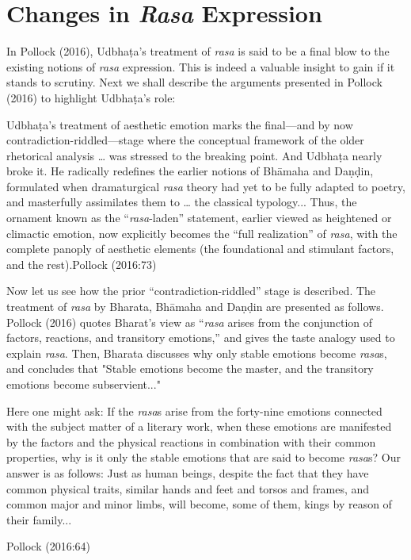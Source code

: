 \section*{Changes in \textsl{Rasa} Expression}

In Pollock (2016), Udbhaṭa’s treatment of \textsl{rasa} is said to be a final blow to the existing notions of \textsl{rasa} expression. This is indeed a valuable insight to gain if it stands to scrutiny. Next we shall describe the arguments presented in Pollock (2016) to highlight Udbhaṭa’s role: 

\begin{myquote}
Udbhaṭa’s treatment of aesthetic emotion marks the final—and by now contradiction-riddled—stage where the conceptual framework of the older rhetorical analysis … was stressed to the breaking point. And Udbhaṭa nearly broke it. He radically redefines the earlier notions of Bhāmaha and Daṇḍin, formulated when dramaturgical \textsl{rasa} theory had yet to be fully adapted to poetry, and masterfully assimilates them to … the classical typology... Thus, the ornament known as the “\textsl{rasa}-laden” statement, earlier viewed as heightened or climactic emotion, now explicitly becomes the “full realization” of \textsl{rasa}, with the complete panoply of aesthetic elements (the foundational and stimulant factors, and the rest).\hfill Pollock (2016:73)
\end{myquote}

Now let us see how the prior “contradiction-riddled” stage is described. The treatment of \textsl{rasa} by Bharata, Bhāmaha and Daṇḍin are presented as follows. Pollock (2016) quotes Bharat’s view as “\textsl{rasa} arises from the conjunction of factors, reactions, and transitory emotions,” and gives the taste analogy used to explain \textsl{rasa}. Then, Bharata discusses why only stable emotions become \textsl{rasa}s, and concludes that "Stable emotions become the master, and the transitory emotions become subservient..." 

\begin{myquote}
[343] Here one might ask: If the \textsl{rasa}s arise from the forty-nine emotions connected with the subject matter of a literary work, when these emotions are manifested by the factors and the physical reactions in combination with their common properties, why is it only the stable emotions that are said to become \textsl{rasa}s? Our answer is as follows: Just as human beings, despite the fact that they have common physical traits, similar hands and feet and torsos and frames, and common major and minor limbs, will become, some of them, kings by reason of their family...

\hfill Pollock (2016:64)
\end{myquote}

